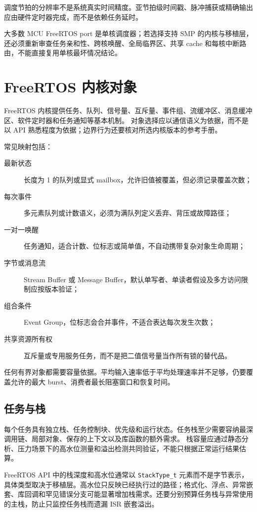 调度节拍的分辨率不是系统真实时间精度。亚节拍级时间戳、脉冲捕获或精确输出应由硬件定时器完成，而不是依赖任务延时。

大多数 MCU FreeRTOS port 是单核调度器；若选择支持 SMP 的内核与移植层，还必须重新审查任务亲和性、跨核唤醒、全局临界区、共享 cache 和每核中断路由，不能直接复用单核最坏情况结论。

\section{FreeRTOS 内核对象}

FreeRTOS 内核提供任务、队列、信号量、互斥量、事件组、流缓冲区、消息缓冲区、软件定时器和任务通知等基本机制。
对象选择应以通信语义为依据，而不是以 API 熟悉程度为依据；边界行为还要核对所选内核版本的参考手册\cite{freertos-reference}。

常见映射包括：
\begin{description}
  \item[最新状态] 长度为 1 的队列或显式 mailbox，允许旧值被覆盖，但必须记录覆盖次数；
  \item[每次事件] 多元素队列或计数语义，必须为满队列定义丢弃、背压或故障路径；
  \item[一对一唤醒] 任务通知，适合计数、位标志或简单值，不自动携带复杂对象生命周期；
  \item[字节或消息流] Stream Buffer 或 Message Buffer，默认单写者、单读者假设及多方访问限制应按版本验证；
  \item[组合条件] Event Group，位标志会合并事件，不适合表达每次发生次数；
  \item[共享资源所有权] 互斥量或专用服务任务，而不是把二值信号量当作所有锁的替代品。
\end{description}

任何有界对象都需要容量依据。平均输入速率低于平均处理速率并不足够，仍要覆盖允许的最大 burst、消费者最长阻塞窗口和恢复时间。

\subsection{任务与栈}

每个任务具有独立栈、任务控制块、优先级和运行状态。任务栈至少需要容纳最深调用链、局部对象、保存的上下文以及库函数的额外需求。
栈容量应通过静态分析、压力场景下的高水位测量和溢出检测共同验证，不能只根据正常运行结果估算。

FreeRTOS API 中的栈深度和高水位通常以 \texttt{StackType\_t} 元素而不是字节表示，具体类型取决于移植层。高水位只反映已经执行过的路径；格式化、浮点、异常嵌套、库回调和罕见错误分支可能显著增加栈需求。还要分别预算任务栈与异常使用的主栈，防止只监控任务栈而遗漏 ISR 嵌套溢出。

